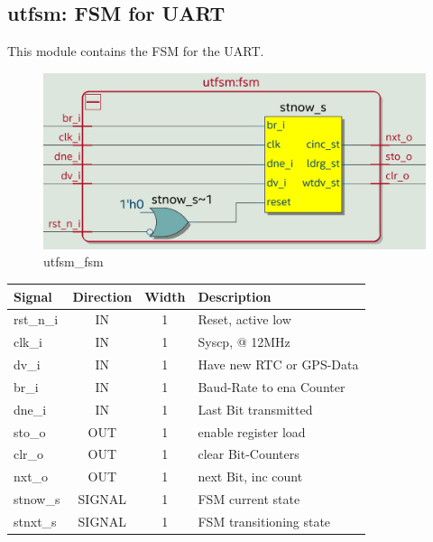 \documentclass[12pt,a4 paper] {report}
\begin{document}
\subsection{utfsm: FSM for UART}
This module contains the FSM for the UART.
\begin{figure}[h]
	\centering	
	\includegraphics[scale=0.2]{../png/utfsm_fsm.png}
	\caption{utfsm\_fsm}
\end{figure}
\begin{center}
	\begin{tabular}{ | p{2cm} | c | c | p{5cm} |}
		\hline
		\textbf{Signal} & \textbf{Direction} & \textbf{Width} & \textbf{Description} \\
		\hline
		\hline
		rst\_n\_i & IN & 1 & Reset, active low \\
		\hline
		clk\_i & IN & 1 & Syscp, @ 12MHz \\
		\hline
		dv\_i  & IN & 1 & Have new RTC or GPS-Data \\
		\hline
		br\_i  & IN & 1 & Baud-Rate to ena Counter \\
		\hline
		dne\_i & IN & 1 & Last Bit transmitted \\
		\hline
		sto\_o & OUT & 1 & enable register load \\
		\hline
		clr\_o & OUT & 1 & clear Bit-Counters \\
		\hline
		nxt\_o & OUT & 1 & next Bit, inc count \\
		\hline
		\hline
		stnow\_s & SIGNAL & 1 & FSM current state \\
		\hline
		stnxt\_s & SIGNAL & 1 & FSM transitioning state \\
		\hline
	\end{tabular}
\end{center}

\newpage
\end{document}
